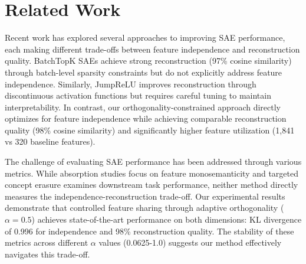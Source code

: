 \documentclass{article} %
\begin{document}
\section{Related Work}
\label{sec:related}




Recent work has explored several approaches to improving SAE performance, each making different trade-offs between feature independence and reconstruction quality. BatchTopK SAEs \cite{bussmannBatchTopKSparseAutoencoders2024} achieve strong reconstruction (97\% cosine similarity) through batch-level sparsity constraints but do not explicitly address feature independence. Similarly, JumpReLU \cite{rajamanoharanJumpingAheadImproving2024} improves reconstruction through discontinuous activation functions but requires careful tuning to maintain interpretability. In contrast, our orthogonality-constrained approach directly optimizes for feature independence while achieving comparable reconstruction quality (98\% cosine similarity) and significantly higher feature utilization (1,841 vs 320 baseline features).

The challenge of evaluating SAE performance has been addressed through various metrics. While absorption studies \cite{chaninAbsorptionStudyingFeature2024} focus on feature monosemanticity and targeted concept erasure \cite{karvonenEvaluatingSparseAutoencoders2024} examines downstream task performance, neither method directly measures the independence-reconstruction trade-off. Our experimental results demonstrate that controlled feature sharing through adaptive orthogonality ($\alpha=0.5$) achieves state-of-the-art performance on both dimensions: KL divergence of 0.996 for independence and 98\% reconstruction quality. The stability of these metrics across different $\alpha$ values (0.0625-1.0) suggests our method effectively navigates this trade-off.
\end{document}
